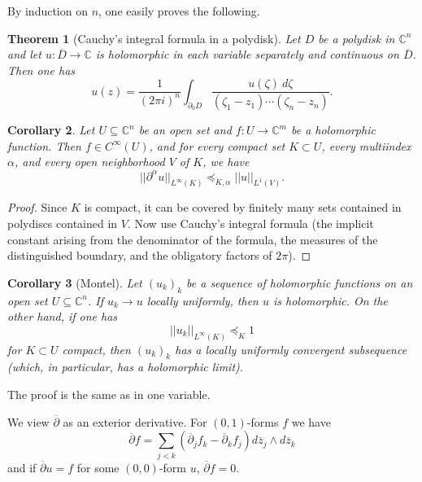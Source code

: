 \documentclass[12pt]{report}
\newcommand{\CC}{\mathbb{C}}
\newcommand{\dbar}{\overline \partial}
\newtheorem{theorem}{Theorem}[chapter]
\newtheorem{corollary}[theorem]{Corollary}
\theoremstyle{definition}
\begin{document}
By induction on $n$, one easily proves the following.
\begin{theorem}[Cauchy's integral formula in a polydisk]
    Let $D$ be a polydisk in $\CC^n$ and let $u: \overline D \to \CC$ is holomorphic in each variable separately and continuous on $\overline D$. Then one has
    $$u(z) = \frac{1}{(2\pi i)^n} \int_{\partial_0 D} \frac{u(\zeta) ~d\zeta}{(\zeta_1 - z_1)\cdots(\zeta_n - z_n)}.$$
\end{theorem}
\begin{corollary}
    Let $U \subseteq \CC^n$ be an open set and $f: U \to \CC^m$ be a holomorphic function. Then $f \in C^\infty(U)$, and for every compact set $K \subset U$, every multiindex $\alpha$, and every open neighborhood $V$ of $K$, we have
    $$||\partial^\alpha u||_{L^\infty(K)} \preceq_{K,\alpha} ||u||_{L^1(V)}.$$
\end{corollary}
\begin{proof}
    Since $K$ is compact, it can be covered by finitely many sets contained in polydiscs contained in $V$. Now use Cauchy's integral formula (the implicit constant arising from the denominator of the formula, the measures of the distinguished boundary, and the obligatory factors of $2\pi$).
\end{proof}
\begin{corollary}[Montel]
    Let $(u_k)_k$ be a sequence of holomorphic functions on an open set $U \subseteq \CC^n$. If $u_k \to u$ locally uniformly, then $u$ is holomorphic. On the other hand, if one has
    $$||u_k||_{L^\infty(K)} \preceq_K 1$$
    for $K \subset U$ compact, then $(u_k)_k$ has a locally uniformly convergent subsequence (which, in particular, has a holomorphic limit).
\end{corollary}
The proof is the same as in one variable.

We view $\dbar$ as an exterior derivative. For $(0, 1)$-forms $f$ we have
$$\dbar f = \sum_{j<k} (\dbar_j f_k - \dbar_k f_j) d\overline z_j \wedge d\overline z_k$$
and if $\dbar u = f$ for some $(0, 0)$-form $u$, $\dbar f = 0$.
\end{document}
